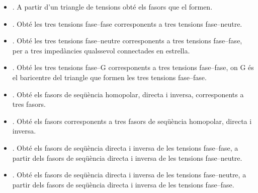 \begin{itemize}
   \item {}. A partir d'un triangle de tensions obté els fasors que el formen.
   \item {}. Obté les tres tensions fase--fase corresponents a tres tensions fase--neutre.
   \item {}. Obté les tres tensions fase--neutre corresponents a tres tensions fase--fase, per a tres impedàncies qualssevol connectades en estrella.
   \item {}. Obté les tres tensions fase--G corresponents a tres tensions fase--fase, on G és el baricentre del triangle que formen les tres tensions fase--fase.
   \item {}. Obté els fasors de seqüència homopolar, directa i inversa, corresponents a tres fasors.
   \item {}. Obté els  fasors corresponents a tres fasors de seqüència homopolar, directa i inversa.
   \item {}. Obté els fasors de seqüència directa i inversa de les tensions fase--fase, a partir dels fasors de seqüència directa i inversa de les tensions fase--neutre.
   \item {}. Obté els fasors de seqüència directa i inversa de les tensions fase--neutre, a partir dels fasors de seqüència directa i inversa de les tensions fase--fase.
\end{itemize}


